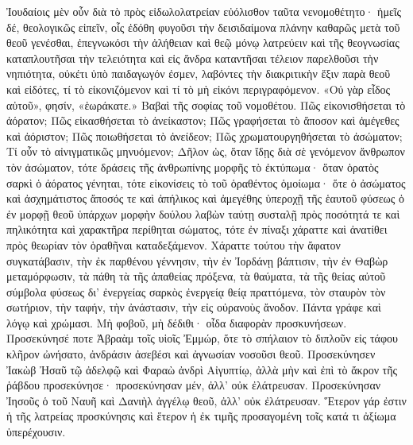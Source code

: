 \documentclass[10pt]{book}
\newcommand{\switchEnglish}{\selectlanguage{english} \switchcolumn}
\begin{document}
\begin{paracol}{2}
Ἰουδαίοις μὲν οὖν διὰ τὸ πρὸς εἰδωλολατρείαν εὐόλισθον ταῦτα νενομοθέτητο· ἡμεῖς δέ, θεολογικῶς εἰπεῖν, οἷς ἐδόθη φυγοῦσι τὴν δεισιδαίμονα πλάνην καθαρῶς μετὰ τοῦ θεοῦ γενέσθαι, ἐπεγνωκόσι τὴν ἀλήθειαν καὶ θεῷ μόνῳ λατρεύειν καὶ τῆς θεογνωσίας καταπλουτῆσαι τὴν τελειότητα καὶ εἰς ἄνδρα καταντῆσαι τέλειον παρελθοῦσι τὴν νηπιότητα, οὐκέτι ὑπὸ παιδαγωγόν ἐσμεν, λαβόντες τὴν διακριτικὴν ἕξιν παρὰ θεοῦ καὶ εἰδότες, τί τὸ εἰκονιζόμενον καὶ τί τὸ μὴ εἰκόνι περιγραφόμενον.
«Οὐ γὰρ εἶδος αὐτοῦ», φησίν, «ἑωράκατε.» Βαβαὶ τῆς σοφίας τοῦ νομοθέτου.
Πῶς εἰκονισθήσεται τὸ ἀόρατον; Πῶς εἰκασθήσεται τὸ ἀνείκαστον; Πῶς γραφήσεται τὸ ἄποσον καὶ ἀμέγεθες καὶ ἀόριστον; Πῶς ποιωθήσεται τὸ ἀνείδεον; Πῶς χρωματουργηθήσεται τὸ ἀσώματον; Τί οὖν τὸ αἰνιγματικῶς μηνυόμενον; Δῆλον ὡς, ὅταν ἴδῃς διὰ σὲ γενόμενον ἄνθρωπον τὸν ἀσώματον, τότε δράσεις τῆς ἀνθρωπίνης μορφῆς τὸ ἐκτύπωμα· ὅταν ὁρατὸς σαρκὶ ὁ ἀόρατος γένηται, τότε εἰκονίσεις τὸ τοῦ ὁραθέντος ὁμοίωμα· ὅτε ὁ ἀσώματος καὶ ἀσχημάτιστος ἄποσός τε καὶ ἀπήλικος καὶ ἀμεγέθης ὑπεροχῇ τῆς ἑαυτοῦ φύσεως ὁ ἐν μορφῇ θεοῦ ὑπάρχων μορφὴν δούλου λαβὼν ταύτῃ συσταλῇ πρὸς ποσότητά τε καὶ πηλικότητα καὶ χαρακτῆρα περίθηται σώματος, τότε ἐν πίναξι χάραττε καὶ ἀνατίθει πρὸς θεωρίαν τὸν ὁραθῆναι καταδεξάμενον.
Χάραττε τούτου τὴν ἄφατον συγκατάβασιν, τὴν ἐκ παρθένου γέννησιν, τὴν ἐν Ἰορδάνῃ βάπτισιν, τὴν ἐν Θαβὼρ μεταμόρφωσιν, τὰ πάθη τὰ τῆς ἀπαθείας πρόξενα, τὰ θαύματα, τὰ τῆς θείας αὐτοῦ σύμβολα φύσεως δι’ ἐνεργείας σαρκὸς ἐνεργείᾳ θείᾳ πραττόμενα, τὸν σταυρὸν τὸν σωτήριον, τὴν ταφήν, τὴν ἀνάστασιν, τὴν εἰς οὐρανοὺς ἄνοδον.
Πάντα γράφε καὶ λόγῳ καὶ χρώμασι.
Μὴ φοβοῦ, μὴ δέδιθι· οἶδα διαφορὰν προσκυνήσεων.
Προσεκύνησέ ποτε Ἀβραὰμ τοῖς υἱοῖς Ἐμμώρ, ὅτε τὸ σπήλαιον τὸ διπλοῦν εἰς τάφου κλῆρον ὠνήσατο, ἀνδράσιν ἀσεβέσι καὶ ἀγνωσίαν νοσοῦσι θεοῦ.
Προσεκύνησεν Ἰακὼβ Ἠσαῦ τῷ ἀδελφῷ καὶ Φαραὼ ἀνδρὶ Αἰγυπτίῳ, ἀλλὰ μὴν καὶ ἐπὶ τὸ ἄκρον τῆς ῥάβδου προσεκύνησε· προσεκύνησαν μέν, ἀλλ’ οὐκ ἐλάτρευσαν.
Προσεκύνησαν Ἰησοῦς ὁ τοῦ Ναυῆ καὶ Δανιὴλ ἀγγέλῳ θεοῦ, ἀλλ’ οὐκ ἐλάτρευσαν.
Ἕτερον γάρ ἐστιν ἡ τῆς λατρείας προσκύνησις καὶ ἕτερον ἡ ἐκ τιμῆς προσαγομένη τοῖς κατά τι ἀξίωμα ὑπερέχουσιν.

\switchEnglish


\end{paracol}
\end{document}
